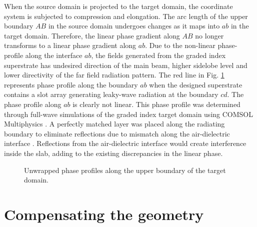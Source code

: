 When the source domain is projected to the target domain, the coordinate system is subjected to compression and elongation. The arc length of the upper boundary $AB$ in the source domain undergoes changes as it maps into $ab$ in the target domain. Therefore, the linear phase gradient along $AB$ no longer transforms to a linear phase gradient along $ab$. Due to the non-linear phase-profile along the interface $ab$, the fields generated from the graded index superstrate has undesired direction of the main beam, higher sidelobe level and lower directivity of the far field radiation pattern. The red line in Fig. \ref{fig:phasea1} represents phase profile along the boundary $ab$ when the designed superstrate contains a slot array generating leaky-wave radiation at the boundary $cd$. The phase profile along $ab$ is clearly not linear. This phase profile was determined through full-wave simulations of the graded index target domain using COMSOL Multiphysics \cite{AlNoor2016}. A perfectly matched layer was placed along the radiating boundary to eliminate reflections due to mismatch along the air-dielectric interface \cite{chew1995}. Reflections from the air-dielectric interface would create interference inside the slab, adding to the existing discrepancies in the linear phase.
%
\begin{figure} [t]

 \begin{center}
 
\end{center}
\caption{Unwrapped phase profiles along the upper boundary of the target domain.}
\label{fig:phasea1}
\end{figure}
%

\section{Compensating the geometry} \label{sec:geocomp}

